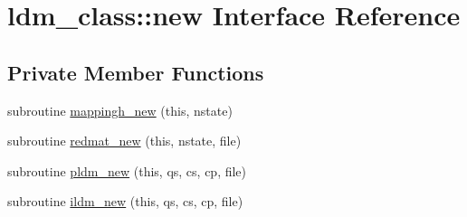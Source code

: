 \hypertarget{interfaceldm__class_1_1new}{\section{ldm\+\_\+class\+:\+:new Interface Reference}
\label{interfaceldm__class_1_1new}
}
\subsection*{Private Member Functions}
\begin{DoxyCompactItemize}
\item 
subroutine \hyperlink{interfaceldm__class_1_1new_a8c2578bba9557ddb095248f7bfb8d0d5}{mappingh\+\_\+new} (this, nstate)
\item 
subroutine \hyperlink{interfaceldm__class_1_1new_af3ec9aa7965a37364b5d4ac753c09f12}{redmat\+\_\+new} (this, nstate, file)
\item 
subroutine \hyperlink{interfaceldm__class_1_1new_a7822330a086add7be0893915de9997be}{pldm\+\_\+new} (this, qs, cs, cp, file)
\item 
subroutine \hyperlink{interfaceldm__class_1_1new_a60f00a14a72e7fb2e8892237b786e5eb}{ildm\+\_\+new} (this, qs, cs, cp, file)
\end{DoxyCompactItemize}


